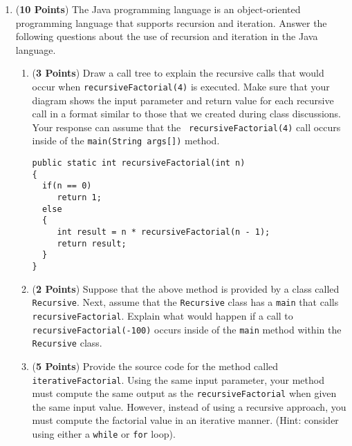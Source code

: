 \documentclass[12pt]{article}
\begin{document}
\begin{enumerate}
\begin{enumerate}
\end{enumerate}

\newpage

\item ({\bf 10 Points}) The Java programming language is an
  object-oriented programming language that supports recursion and
  iteration.  Answer the following questions about the use of
  recursion and iteration in the Java language.

\begin{enumerate}
  
\item ({\bf 3 Points}) Draw a call tree to explain the recursive calls
  that would occur when {\tt recursiveFactorial(4)} is executed.  Make
  sure that your diagram shows the input parameter and return value
  for each recursive call in a format similar to those that we created
  during class discussions.  Your response can assume that the {\tt
    recursiveFactorial(4)} call occurs inside of the {\tt main(String args[])}
  method.

\begin{verbatim}
public static int recursiveFactorial(int n)
{
  if(n == 0)
     return 1;
  else
  {
     int result = n * recursiveFactorial(n - 1);
     return result;
  }
} 
\end{verbatim}

\item ({\bf 2 Points}) Suppose that the above method is provided by a
  class called {\tt Recursive}.  Next, assume that the {\tt Recursive}
  class has a {\tt main} that calls {\tt recursiveFactorial}.  Explain
  what would happen if a call to {\tt recursiveFactorial(-100)} occurs
  inside of the {\tt main} method within the {\tt Recursive} class.


\item ({\bf 5 Points}) Provide the source code for the method called
  {\tt iterativeFactorial}.  Using the same input parameter, your
  method must compute the same output as the {\tt recursiveFactorial}
  when given the same input value.  However, instead of using a
  recursive approach, you must compute the factorial value in an
  iterative manner.  (Hint: consider using either a {\tt while} or
  {\tt for} loop).


\end{enumerate}
\end{enumerate}
\end{document}
